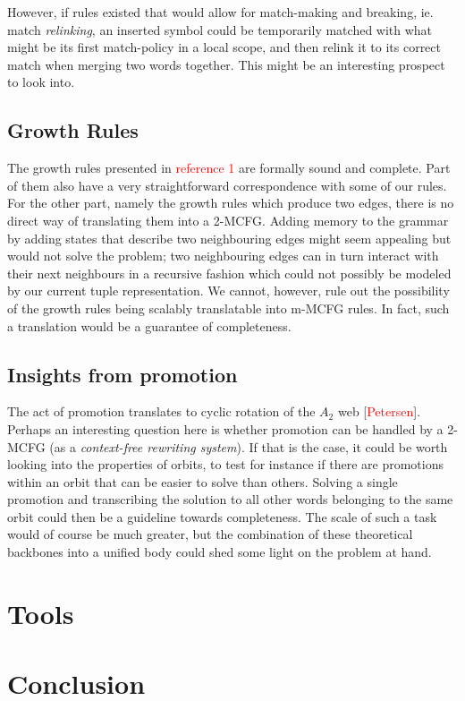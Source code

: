 \documentclass[nonatbib,numbers,10pt]{sigplanconf}
\newcommand\todo[1]{\textcolor{red}{#1}}
\begin{document}
However, if rules existed that would allow for match-making and breaking, ie. match \textit{relinking}, an inserted symbol could be temporarily matched with what might be its first match-policy in a local scope, and then relink it to its correct match when merging two words together. This might be an interesting prospect to look into. 
\subsection{Growth Rules}
The growth rules presented in \todo{reference 1} are formally sound and complete. Part of them also have a very straightforward correspondence with some of our rules. For the other part, namely the growth rules which produce two edges, there is no direct way of translating them into a 2-MCFG. Adding memory to the grammar by adding states that describe two neighbouring edges might seem appealing but would not solve the problem; two neighbouring edges can in turn interact with their next neighbours in a recursive fashion which could not possibly be modeled by our current tuple representation. We cannot, however, rule out the possibility of the growth rules being scalably translatable into m-MCFG rules. In fact, such a translation would be a guarantee of completeness. 
\subsection{Insights from promotion}
The act of promotion translates to cyclic rotation of the $A_2$ web [\todo{Petersen}]. Perhaps an interesting question here is whether promotion can be handled by a 2-MCFG (as a \textit{context-free rewriting system}). If that is the case, it could be worth looking into the properties of orbits, to test for instance if there are promotions within an orbit that can be easier to solve than others. Solving a single promotion and transcribing the solution to all other words belonging to the same orbit could then be a guideline towards completeness. The scale of such a task would of course be much greater, but the combination of these theoretical backbones into a unified body could shed some light on the problem at hand.

\section{Tools}
\section{Conclusion}
\end{document}
